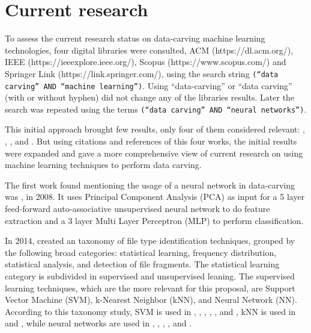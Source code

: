 \section{Current research}
To assess the current research status on data-carving machine learning technologies, four digital libraries were consulted, ACM (https://dl.acm.org/), IEEE (https://ieeexplore.ieee.org/), Scopus (https://www.scopus.com/) and Springer Link (https://link.springer.com/), using the search string 
{\texttt{(``data carving'' AND ``machine learning'')}}. Using ``data-carving'' or ``data carving'' (with or without hyphen) did not change any of the libraries results. Later the search was repeated using the terms {\texttt{(``data carving'' AND ``neural networks'')}}.

This initial approach brought few results, only four of them considered relevant: \cite{alamri_taxonomy_2014}, 
\cite{ali_review_2018}, \cite{sportiello_context-based_2012}, and \cite{beebe_sceadan:_2013}. But using citations and references of this four works, the initial results were expanded and gave a more comprehensive view of current research on using machine learning techniques to perform data carving.

The first work found mentioning the usage of a neural network in data-carving was \cite{amirani_new_2008}, in 2008. It uses Principal Component Analysis (PCA) as input for a 5 layer feed-forward auto-associative unsupervised neural network to do feature extraction and a 3 layer Multi Layer Perceptron (MLP) to perform classification.

In 2014, \cite{alamri_taxonomy_2014} created an taxonomy of file type identification techniques, grouped by the following broad categories: statistical learning, frequency distribution, statistical analysis, and detection of file fragments. The statistical learning category is subdivided in supervised and unsupervised leaning. The supervised learning techniques, which are the more relevant for this proposal, are Support Vector Machine (SVM), k-Nearest Neighbor (kNN), and Neural Network (NN). According to this taxonomy study, SVM is used in \cite{ahmed_fast_2011}, \cite{amirani_feature-based_2013}, \cite{beebe_sceadan:_2013}, \cite{fitzgerald_using_2012}, \cite{gopal_statistical_2011}, and \cite{sportiello_context-based_2012}, kNN is used in \cite{ahmed_fast_2011} and \cite{gopal_statistical_2011}, while neural networks are used in \cite{ahmed_fast_2011}, \cite{ahmed_content-based_2010}, \cite{amirani_new_2008}, \cite{amirani_feature-based_2013}, and \cite{penrose_approaches_2013}.


